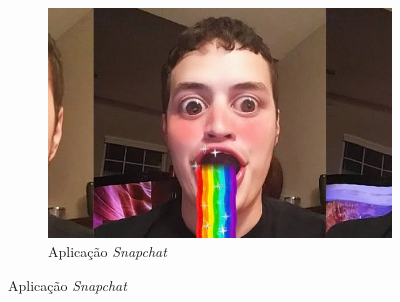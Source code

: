 \documentclass{report}
\begin{document}
\begin{figure}[H]
    \centering
    \begin{subfigure}[b]{.45\linewidth}
        \includegraphics[width=\linewidth]{snapchat.jpg}
        \caption{Aplicação \textit{Snapchat}}\label{fig:snapchat}
    \end{subfigure}


\end{figure}
\end{document}
